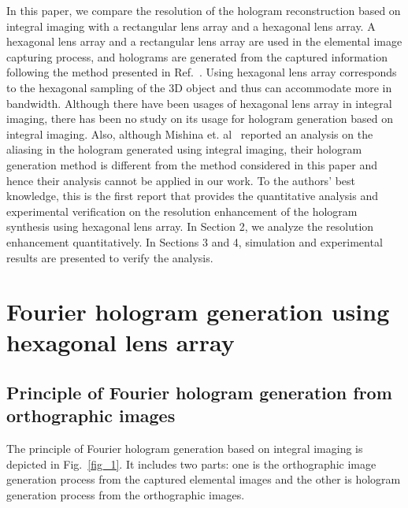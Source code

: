 \documentclass[10pt,letterpaper]{article}
\begin{document}
In this paper, we compare the resolution of the hologram reconstruction based on integral imaging with a rectangular lens array and a hexagonal lens array. A hexagonal lens array and a rectangular lens array are used in the elemental image capturing process, and holograms are generated from the captured information following the method presented in Ref.~\cite{Park_2009_OE}. Using hexagonal lens array corresponds to the hexagonal sampling of the 3D object and thus can accommodate more in bandwidth. Although there have been usages of hexagonal lens array in integral imaging, there has been no study on its usage for hologram generation based on integral imaging. Also, although Mishina et. al~\cite{Mishina_2006_AO} reported an analysis on the aliasing in the hologram generated using integral imaging, their hologram generation method is different from the method considered in this paper and hence their analysis cannot be applied in our work. To the authors' best knowledge, this is the first report that provides the quantitative analysis and experimental verification on the resolution enhancement of the hologram synthesis using hexagonal lens array. In Section 2, we analyze the resolution enhancement quantitatively. In Sections 3 and 4, simulation and experimental results are presented to verify the analysis.

\section{Fourier hologram generation using hexagonal lens array}

\subsection{Principle of Fourier hologram generation from orthographic images}
The principle of Fourier hologram generation based on integral imaging is depicted in Fig.~\ref{fig_1}. It includes two parts: one is the orthographic image generation process from the captured elemental images and the other is hologram generation process from the orthographic images. 
\end{document}
